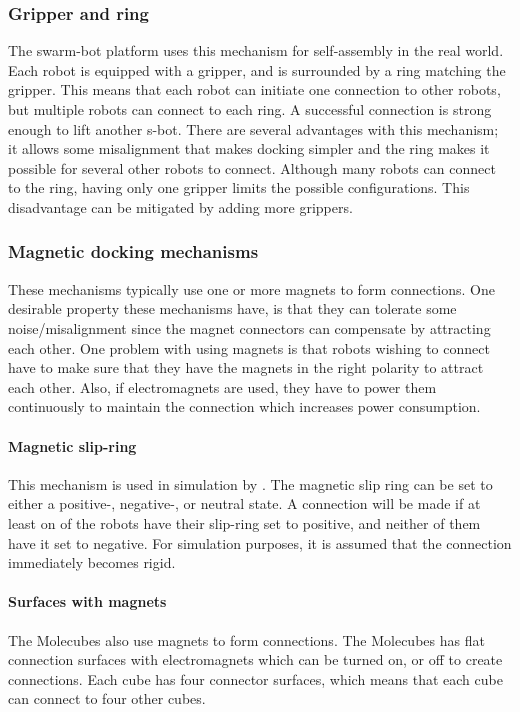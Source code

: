 \subsubsection*{Gripper and ring}
The swarm-bot platform\cite{gro_autonomous_2006} uses this mechanism for self-assembly in the real world.
Each robot is equipped with a gripper, and is surrounded by a ring matching the gripper. 
This means that each robot can initiate one connection to other robots, but multiple robots can connect to each ring.
A successful connection is strong enough to lift another s-bot.
There are several advantages with this mechanism; it allows some misalignment that makes docking simpler and the ring makes it possible for several other robots to connect.
Although many robots can connect to the ring, having only one gripper limits the possible configurations.
This disadvantage can be mitigated by adding more grippers.

\subsubsection*{Magnetic docking mechanisms}
These mechanisms typically use one or more magnets to form connections.
One desirable property these mechanisms have, is that they can tolerate some noise/misalignment since the magnet connectors can compensate by attracting each other.
One problem with using magnets is that robots wishing to connect have to make sure that they have the magnets in the right polarity to attract each other.
Also, if electromagnets are used, they have to power them continuously to maintain the connection which increases power consumption.

\paragraph*{Magnetic slip-ring}
This mechanism is used in simulation by \cite{weel_emergence_2012}.
The magnetic slip ring can be set to either a positive-, negative-, or neutral state.
A connection will be made if at least on of the robots have their slip-ring set to positive, and neither of them have it set to negative.
For simulation purposes, it is assumed that the connection immediately becomes rigid.
\paragraph*{Surfaces with magnets}
The Molecubes\cite{studer_spontaneous_2006} also use magnets to form connections.
The Molecubes has flat connection surfaces with electromagnets which can be turned on, or off to create connections.
Each cube has four connector surfaces, which means that each cube can connect to four other cubes.
